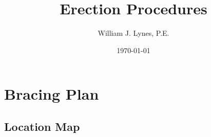 \documentclass[11pt,letterpaper]{report}
\author{William J. Lynes, P.E.}
\title{Erection Procedures}
\date{\today}
\begin{document}
 
\setcounter{page}{1}
\tableofcontents

\newpage

\newcommand\zzz[1]{%
\vspace*{\fill}
{\centering\fontsize{24pt}{24pt}\bfseries#1\par}
\vspace*{\fill}
\clearpage}
\titleformat{\chapter}{\zzz}{}{1em}{}


\newcommand\yyy[1]{%
\clearpage
\vspace*{\fill}
{\centering\fontsize{18pt}{18pt}\bfseries#1\par}
\vspace*{\fill}
\clearpage}
\titleformat{\section}{\yyy}{}{1em}{}

\newcommand\aaa[1]{%
\clearpage
\vspace*{\fill}
{\centering\fontsize{14pt}{14pt}\bfseries#1\par}
\vspace*{\fill}
\clearpage}
\titleformat{\subsection}{\aaa}{}{1em}{}




\setcounter{page}{1}
\setcounter{chapter}{0}
\renewcommand{\thepage}{}
\renewcommand{\thechapter}{\arabic{chapter}}
\chapter{Bracing Plan}
\setcounter{page}{1}
\renewcommand{\thepage}{\arabic{chapter}-\arabic{page}}
\section{Location Map}
% 
\end{document}
